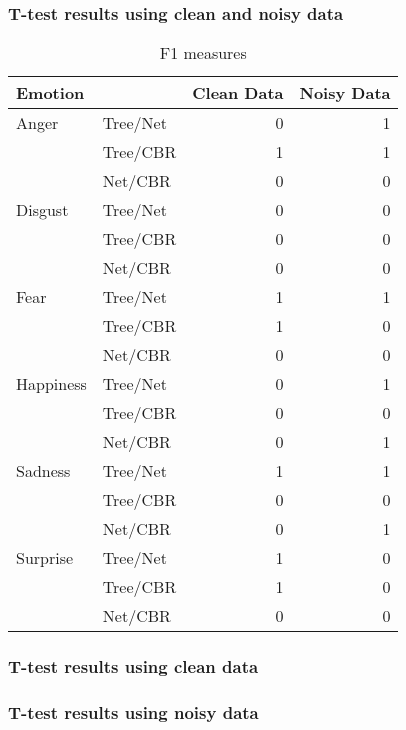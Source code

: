 \documentclass[12pt]{article}
\begin{document}
\subsubsection*{T-test results using clean and noisy data}
\begin{table}[h]
\centering
\begin{tabular}{l l | r r}
Emotion   &          & Clean Data & Noisy Data \\
\hline
Anger     & Tree/Net & 0          & 1          \\
          & Tree/CBR & 1          & 1          \\
          & Net/CBR  & 0          & 0          \\
Disgust   & Tree/Net & 0          & 0          \\
          & Tree/CBR & 0          & 0          \\
          & Net/CBR  & 0          & 0          \\
Fear      & Tree/Net & 1          & 1          \\
          & Tree/CBR & 1          & 0          \\
          & Net/CBR  & 0          & 0          \\
Happiness & Tree/Net & 0          & 1          \\
          & Tree/CBR & 0          & 0          \\
          & Net/CBR  & 0          & 1          \\
Sadness   & Tree/Net & 1          & 1          \\
          & Tree/CBR & 0          & 0          \\
          & Net/CBR  & 0          & 1          \\
Surprise  & Tree/Net & 1          & 0          \\
          & Tree/CBR & 1          & 0          \\
          & Net/CBR  & 0          & 0          \\
\end{tabular}
\caption{F1 measures}
\end{table}

\subsubsection*{T-test results using clean data}

\subsubsection*{T-test results using noisy data}
\end{document}
